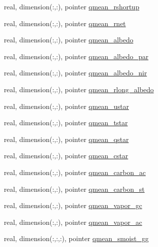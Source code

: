 \begin{DoxyCompactItemize}
real, dimension(\+:,\+:), pointer \hyperlink{structed__state__vars_1_1edtype_a634bc2c096a78e7d05d3c6f3d802a9b6}{qmean\+\_\+rshortup}
\item 
real, dimension(\+:,\+:), pointer \hyperlink{structed__state__vars_1_1edtype_abaa0ac39a342d81c60cc9f7124794558}{qmean\+\_\+rnet}
\item 
real, dimension(\+:,\+:), pointer \hyperlink{structed__state__vars_1_1edtype_a1f0beb306982428fbda3adb37729dccc}{qmean\+\_\+albedo}
\item 
real, dimension(\+:,\+:), pointer \hyperlink{structed__state__vars_1_1edtype_aba8cf9b997bdb0dbd0510ee23bbcebf2}{qmean\+\_\+albedo\+\_\+par}
\item 
real, dimension(\+:,\+:), pointer \hyperlink{structed__state__vars_1_1edtype_a0730d0185af1c1f9d7c4fe199bb0aadc}{qmean\+\_\+albedo\+\_\+nir}
\item 
real, dimension(\+:,\+:), pointer \hyperlink{structed__state__vars_1_1edtype_adf12091e11f4903e91ee9ee95f1e38c9}{qmean\+\_\+rlong\+\_\+albedo}
\item 
real, dimension(\+:,\+:), pointer \hyperlink{structed__state__vars_1_1edtype_ac24c34aef385c748992890c9b2288f63}{qmean\+\_\+ustar}
\item 
real, dimension(\+:,\+:), pointer \hyperlink{structed__state__vars_1_1edtype_a698317ffcff0551bffe41042c41cf709}{qmean\+\_\+tstar}
\item 
real, dimension(\+:,\+:), pointer \hyperlink{structed__state__vars_1_1edtype_a54fdcbe26f9d75bf4c95d0d7ef36918e}{qmean\+\_\+qstar}
\item 
real, dimension(\+:,\+:), pointer \hyperlink{structed__state__vars_1_1edtype_a09f13cd2e5743c05018c88212f0a69d9}{qmean\+\_\+cstar}
\item 
real, dimension(\+:,\+:), pointer \hyperlink{structed__state__vars_1_1edtype_a8dcd2557b61cd84eabf6742b0b080b2e}{qmean\+\_\+carbon\+\_\+ac}
\item 
real, dimension(\+:,\+:), pointer \hyperlink{structed__state__vars_1_1edtype_a4c4a2161f228e1884817ef2996a87303}{qmean\+\_\+carbon\+\_\+st}
\item 
real, dimension(\+:,\+:), pointer \hyperlink{structed__state__vars_1_1edtype_a7dd91e5f088988f1396f2c6f4d280be1}{qmean\+\_\+vapor\+\_\+gc}
\item 
real, dimension(\+:,\+:), pointer \hyperlink{structed__state__vars_1_1edtype_a3e6ecc81d0cec7ab902259f0d02d5c73}{qmean\+\_\+vapor\+\_\+ac}
\item 
real, dimension(\+:,\+:,\+:), pointer \hyperlink{structed__state__vars_1_1edtype_aa697a4b5a6075e13e00dba4ae29723c5}{qmean\+\_\+smoist\+\_\+gg}

\end{DoxyCompactItemize}
